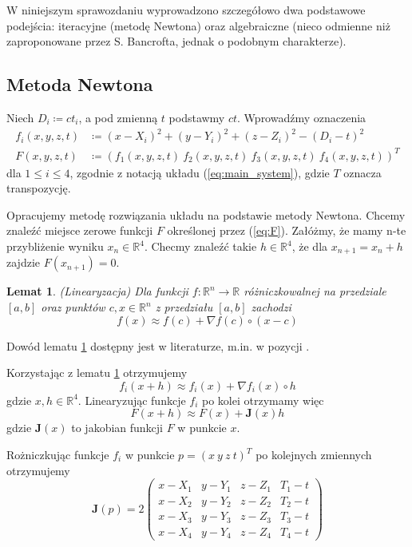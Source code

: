 \documentclass{article}
\newtheorem{lemma}{Lemat}
\begin{document}
W niniejszym sprawozdaniu wyprowadzono szczegółowo dwa podstawowe podejścia: iteracyjne (metodę Newtona) oraz
algebraiczne (nieco odmienne niż zaproponowane przez S. Bancrofta, jednak o podobnym charakterze).

\subsection{Metoda Newtona} \label{newton}
Niech $D_i \coloneqq ct_i$, a pod zmienną $t$ podstawmy $ct$.
Wprowadźmy oznaczenia
\begin{align}
\label{eq:f} f_i(x, y, z, t) &\coloneqq (x-X_i)^2 + (y-Y_i)^2 + (z-Z_i)^2 - (D_i-t)^2 \\
\label{eq:F} F(x, y, z, t) &\coloneqq (f_1(x, y, z, t) \ f_2(x, y, z, t) \ f_3(x, y, z, t) \ f_4(x, y, z, t))^T
\end{align}
dla $1 \leq i \leq 4$, zgodnie z notacją układu (\ref{eq:main_system}), gdzie $T$ oznacza transpozycję.

Opracujemy metodę rozwiązania układu na podstawie metody Newtona. Chcemy znaleźć miejsce zerowe funkcji
$F$ określonej przez (\ref{eq:F}). Załóżmy, że mamy n-te przybliżenie wyniku $x_n \in \mathbb{R}^4$.
Checmy znaleźć takie $h \in \mathbb{R}^4$, że dla $x_{n+1} = x_n + h$ zajdzie $F(x_{n+1}) = 0$.

\begin{lemma}(Linearyzacja) \label{th:linearize}
    Dla funkcji $f: \mathbb{R}^n \rightarrow \mathbb{R}$ różniczkowalnej na przedziale $[a, b]$
    oraz punktów $c, x \in \mathbb{R}^n$ z przedziału $[a, b]$ zachodzi
    \[
        f(x) \approx f(c) + \nabla f(c) \circ (x - c)
    \]
\end{lemma}
Dowód lematu \ref{th:linearize} dostępny jest w literaturze, m.in. w pozycji \cite{linearize}.

Korzystając z lematu \ref{th:linearize} otrzymujemy
\[
f_i(x+h) \approx f_i(x) + \nabla f_i(x) \circ h
\]
gdzie $x, h \in \mathbb{R}^4$.
Linearyzując funkcje $f_i$ po kolei otrzymamy więc
\[
F(x+h) \approx F(x) + \mathbf{J}(x)h
\]
gdzie $\mathbf{J}(x)$ to jakobian funkcji $F$ w punkcie $x$.

Rożniczkując funkcje $f_i$ w punkcie $p=(x \ y \ z \ t)^T$ po kolejnych zmiennych otrzymujemy
\[
\label{eq:jacobian}
\mathbf{J}(p) = 2
\begin{pmatrix}
    x-X_1  & y-Y_1 & z-Z_1 & T_1-t \\
    x-X_2  & y-Y_2 & z-Z_2 & T_2-t \\
    x-X_3  & y-Y_3 & z-Z_3 & T_3-t \\
    x-X_4  & y-Y_4 & z-Z_4 & T_4-t
\end{pmatrix}
\]
\end{document}
